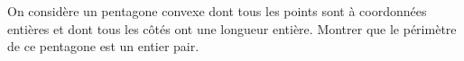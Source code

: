 On considère un pentagone convexe dont tous les points sont à coordonnées entières et dont tous les côtés ont une longueur entière. Montrer que le périmètre de ce pentagone est un entier pair.
